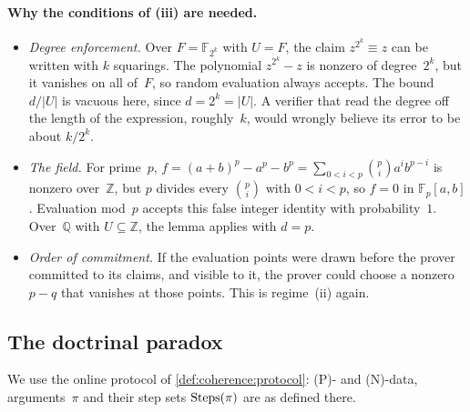 \paragraph{Why the conditions of (iii) are needed.}
\begin{itemize}
\item \emph{Degree enforcement.} Over $F=\mathbb F_{2^k}$ with $U=F$, the claim $z^{2^k}\equiv z$ can be written with $k$ squarings. The polynomial $z^{2^k}-z$ is nonzero of degree~$2^k$, but it vanishes on all of~$F$, so random evaluation always accepts. The bound $d/|U|$ is vacuous here, since $d=2^k=|U|$. A verifier that read the degree off the length of the expression, roughly~$k$, would wrongly believe its error to be about $k/2^k$.
\item \emph{The field.} For prime~$p$, $f=(a+b)^p-a^p-b^p=\sum_{0<i<p}\binom pi a^ib^{p-i}$ is nonzero over~$\mathbb Z$, but $p$ divides every $\binom pi$ with $0<i<p$, so $f=0$ in $\mathbb F_p[a,b]$. Evaluation mod~$p$ accepts this false integer identity with probability~$1$. Over~$\mathbb Q$ with $U\subseteq\mathbb Z$, the lemma applies with $d=p$.
\item \emph{Order of commitment.} If the evaluation points were drawn before the prover committed to its claims, and visible to it, the prover could choose a nonzero $p-q$ that vanishes at those points. This is regime~(ii) again.
\end{itemize}

\subsection{The doctrinal paradox}\label{app:search:doctrinal}

We use the online protocol of \cref{def:coherence:protocol}: (P)- and (N)-data, arguments~$\pi$ and their step sets $\mathrm{Steps}(\pi)$ are as defined there.


